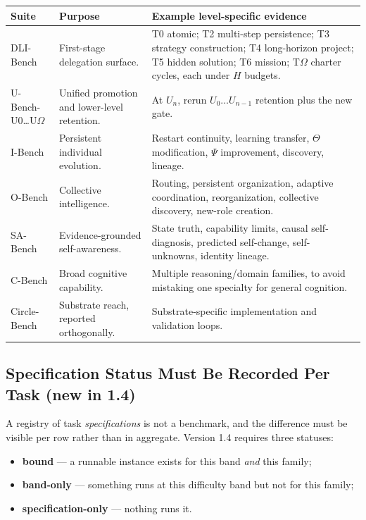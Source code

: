\documentclass[11pt]{article}
\theoremstyle{definition}
\newcommand{\Om}{\ensuremath{\Omega}}
\begin{document}
\begin{table}[h]
\centering\small
\begin{tabularx}{\textwidth}{@{}lYY@{}}
\toprule
Suite & Purpose & Example level-specific evidence \\
\midrule
DLI-Bench & First-stage delegation surface. & T0 atomic; T2 multi-step persistence; T3 strategy construction; T4 long-horizon project; T5 hidden solution; T6 mission; T\Om{} charter cycles, each under $H$ budgets. \\
U-Bench-U0\ldots U\Om{} & Unified promotion and lower-level retention. & At $U_n$, rerun $U_0 \ldots U_{n-1}$ retention plus the new gate. \\
I-Bench & Persistent individual evolution. & Restart continuity, learning transfer, $\Theta$ modification, $\Psi$ improvement, discovery, lineage. \\
O-Bench & Collective intelligence. & Routing, persistent organization, adaptive coordination, reorganization, collective discovery, new-role creation. \\
SA-Bench & Evidence-grounded self-awareness. & State truth, capability limits, causal self-diagnosis, predicted self-change, self-unknowns, identity lineage. \\
C-Bench & Broad cognitive capability. & Multiple reasoning/domain families, to avoid mistaking one specialty for general cognition. \\
Circle-Bench & Substrate reach, reported orthogonally. & Substrate-specific implementation and validation loops. \\
\bottomrule
\end{tabularx}
\end{table}

\subsection{Specification Status Must Be Recorded Per Task (new in 1.4)}

A registry of task \emph{specifications} is not a benchmark, and the difference must be visible per row rather than in aggregate. Version 1.4 requires three statuses:

\begin{itemize}
\item \textbf{bound} --- a runnable instance exists for this band \emph{and} this family;
\item \textbf{band-only} --- something runs at this difficulty band but not for this family;
\item \textbf{specification-only} --- nothing runs it.
\end{itemize}
\end{document}
